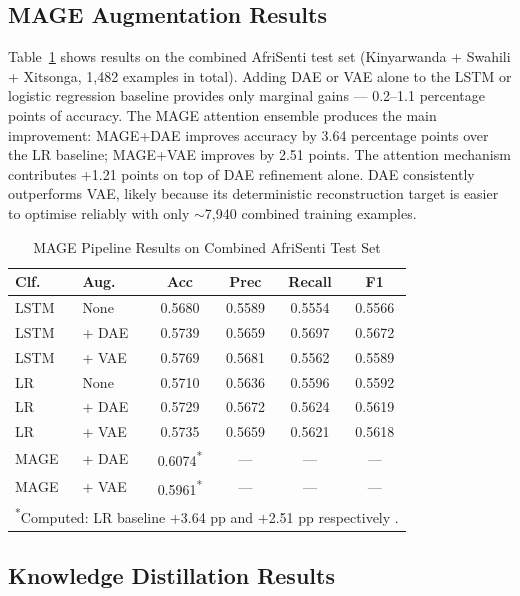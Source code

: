 \documentclass[conference]{IEEEtran}
\begin{document}
\subsection{MAGE Augmentation Results}\label{sec:res_mage}

Table~\ref{tab:mage} shows results on the combined AfriSenti test set
(Kinyarwanda + Swahili + Xitsonga, 1,482 examples in total). Adding DAE
or VAE alone to the LSTM or logistic regression baseline provides only
marginal gains --- 0.2--1.1 percentage points of accuracy. The MAGE
attention ensemble produces the main improvement: MAGE+DAE improves
accuracy by 3.64 percentage points over the LR baseline; MAGE+VAE
improves by 2.51 points. The attention mechanism contributes +1.21 points
on top of DAE refinement alone. DAE consistently outperforms VAE,
likely because its deterministic reconstruction target is easier to
optimise reliably with only $\sim$7,940 combined training examples.

\begin{table}[htbp]
\caption{MAGE Pipeline Results on Combined AfriSenti Test Set}
\label{tab:mage}
\begin{center}
\small
\begin{tabular}{llcccc}
\toprule
\textbf{Clf.} & \textbf{Aug.} & \textbf{Acc} & \textbf{Prec} & \textbf{Recall} & \textbf{F1} \\
\midrule
LSTM & None  & 0.5680 & 0.5589 & 0.5554 & 0.5566 \\
LSTM & + DAE & 0.5739 & 0.5659 & 0.5697 & 0.5672 \\
LSTM & + VAE & 0.5769 & 0.5681 & 0.5562 & 0.5589 \\
\midrule
LR   & None  & 0.5710 & 0.5636 & 0.5596 & 0.5592 \\
LR   & + DAE & 0.5729 & 0.5672 & 0.5624 & 0.5619 \\
LR   & + VAE & 0.5735 & 0.5659 & 0.5621 & 0.5618 \\
\midrule
MAGE & + DAE & 0.6074\textsuperscript{*} & --- & --- & --- \\
MAGE & + VAE & 0.5961\textsuperscript{*} & --- & --- & --- \\
\bottomrule
\multicolumn{6}{l}{\small \textsuperscript{*}Computed: LR baseline $+$3.64 pp and $+$2.51 pp respectively \cite{b_mage}.} \\
\end{tabular}
\end{center}
\end{table}

\subsection{Knowledge Distillation Results}\label{sec:res_distill}
\end{document}
